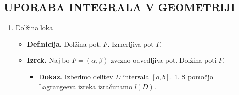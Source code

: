 \subsection{UPORABA INTEGRALA V GEOMETRIJI}
\begin{enumerate}
    \item Dolžina loka
    \begin{itemize}
        \item \colorbox{purple!30}{\textbf{Definicija.}} Dolžina poti $F$. Izmerljiva pot $F$. 
        \item \colorbox{blue!30}{\textbf{Izrek.}} Naj bo $F=(\alpha, \beta)$ zvezno odvedljiva pot. Dolžina poti $F$.
        \begin{itemize}
            \item \colorbox{green!30}{\textbf{Dokaz.}} Izberimo delitev $D$ intervala $[a, b]$. 1. S pomočjo Lagrangeeva izreka izračunamo $l(D)$. 
            

\end{itemize}
\end{itemize}
\end{enumerate}
